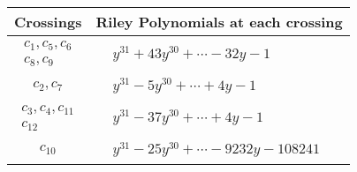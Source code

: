 \documentclass[1p]{elsarticle_modified}
\theoremstyle{definition}
\begin{document}
\begin{tabular}{m{50pt}|m{274pt}}
Crossings & \hspace{64pt}Riley Polynomials at each crossing \\
\hline $$\begin{aligned}c_{1},c_{5},c_{6}\\c_{8},c_{9}\end{aligned}$$&$\begin{aligned}
&y^{31}+43 y^{30}+\cdots-32 y-1
\end{aligned}$\\
\hline $$\begin{aligned}c_{2},c_{7}\end{aligned}$$&$\begin{aligned}
&y^{31}-5 y^{30}+\cdots+4 y-1
\end{aligned}$\\
\hline $$\begin{aligned}c_{3},c_{4},c_{11}\\c_{12}\end{aligned}$$&$\begin{aligned}
&y^{31}-37 y^{30}+\cdots+4 y-1
\end{aligned}$\\
\hline $$\begin{aligned}c_{10}\end{aligned}$$&$\begin{aligned}
&y^{31}-25 y^{30}+\cdots-9232 y-108241
\end{aligned}$\\
\hline
\end{tabular}
\vskip 2pc
\end{document}

